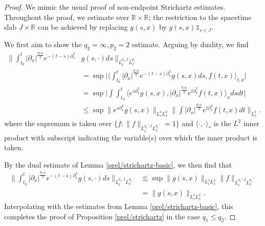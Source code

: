 \documentclass[10pt,a4paper]{amsart}
\newcommand{\R}{\mathbb{R}}
\begin{document}
\begin{proof}
    We mimic the usual proof of non-endpoint Strichartz estimates. Throughout the proof, we estimate over $\R \times \R$; the restriction to the spacetime slab $J \times \R$ can be achieved by replacing $g(s,x)$ by $g(s,x) \mathds{1}_{s \in J}$.

    We first aim to show the $q_2 = \infty, p_2 = 2$ estimate. Arguing by duality, we find
    \begin{align*}
        \bigg\|\int_{t_0}^t |\partial_x|^\frac{\theta_1\alpha}{2} e^{-(t-s)\partial_x^3}&  g(s,\cdot) ds\bigg\|_{L_t^{q_1,2}L_x^{p_1}} \\
        & = \sup\bigg|\bigg\langle\int_{t_0}^t |\partial_x|^\frac{\theta_1\alpha}{2} e^{-(t-s)\partial_x^3} g(s,x) ds,  f(t,x)\bigg\rangle_{t,x}\bigg| \\
        & = \sup\bigg|\int \int_{t_0}^t\Big\langle  e^{s\partial_x^3} g(s,x),|\partial_x|^\frac{\theta_1\alpha}{2}e^{t\partial_x^3}f(t,x)\Big\rangle_{x}dsdt\bigg| \\
        & \leq \sup\big\|e^{s\partial_x^3} g(s,x)\big\|_{L_s^1L_x^2}\bigg\|\int |\partial_x|^\frac{\theta_1\alpha}{2}e^{t\partial_x^3}f(t,x)dt\bigg\|_{L_x^2}.
    \end{align*}
    where the supremum is taken over $\big\{f : \|f\|_{L_t^{q_1',2}L_x^{p_1'}} = 1\big\}$ and $\langle\cdot,\cdot\rangle_*$ is the $L^2$ inner product with subscript indicating the variable(s) over which the inner product is taken.

    By the dual estimate of Lemma \ref{prel/strichartz-basic}, we then find that
    \begin{align*}
        \bigg\|\int_{t_0}^t |\partial_x|^\frac{\theta_1\alpha}{2} e^{-(t-s)\partial_x^3} g(s,\cdot) ds\bigg\|_{L_t^{q_1,2}L_x^{p_1}}
        & \lesssim \sup\|g(s,x)\|_{L_s^1L_x^2}\|f\|_{L_t^{q_1',2}L_x^{p_1'}}\\
        & = \|g(s,x)\|_{L_s^1 L_x^2}.
    \end{align*}
    Interpolating with the estimates from Lemma \ref{prel/strichartz-basic}, this completes the proof of Proposition \ref{prel/strichartz} in the case $q_1 \leq q_2$.


\end{proof}
\end{document}
